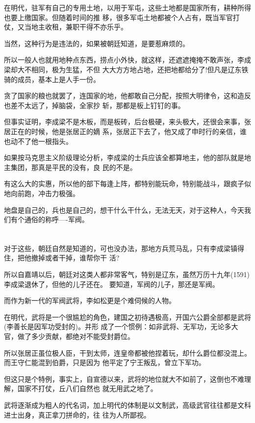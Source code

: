 \documentclass[11pt,a4paper,onecolumn]{article}
\begin{document}
在明代，驻军有自己的专用土地，以用于军屯，这些土地都是国家所有，耕种所得也要上缴国家。但随着时间的推
移，很多军屯土地都被个人占有，既当军官打仗，又当地主收租，兼职干得不亦乐乎。

当然，这种行为是违法的，如果被朝廷知道，是要惹麻烦的。

所以一般人也就用地种点东西，捞点小外快，就这样，还遮遮掩掩不敢声张，李成梁却大不相同，极为生猛，不但
大大方方地占地，还把地都给分了!但凡是辽东铁骑的成员，基本上是人手一份。

贪了国家的粮也就罢了，连国家的地，他都敢自己分配，按照大明律令，这和造反也差不太远了，掉脑袋，全家抄
斩，那都是板上钉钉的事。

但事实证明，李成梁不是木板，而是板砖，后台极硬，来头极大，还很会来事，张居正在的时候，他是张居正的嫡
系，张居正下去了，他又成了申时行的亲信，谁也动不了他一根指头。

如果按马克思主义阶级理论分析，李成梁的士兵应该全都算地主，他的部队就是地主集团，那真是平民的没有，良
民的不是。

有这么大的实惠，所以他的部下每逢上阵，都特别能玩命，特别能战斗，跟疯子似地向前跑，冲击力极强。

地盘是自己的，兵也是自己的，想干什么干什么，无法无天，对于这种人，今天我们有个通俗的称呼----军阀。

\section[\thesection]{}

对于这些，朝廷自然是知道的，可也没办法，那地方兵荒马乱，只有李成梁镇得住，把他撤掉或者干掉，谁帮你干
活?

所以自嘉靖以后，朝廷对这类人都非常客气，特别是辽东，虽然万历十九年(1591)李成梁退休了，但他的儿子还在。
要知道，军阀的儿子，那还是军阀。

而作为新一代的军阀武将，李如松更是个难伺候的人物。

在明代，武将是一个很尴尬的角色，建国之初待遇极高，开国六公爵全部都是武将(李善长是因军功受封的)。并形
成了一个惯例：如非武将、无军功，无论多大官，做了多少贡献，都绝对不能受封爵位。

所以张居正虽位极人臣，干到太师，连皇帝都被他捏着玩，却什么爵位都没混上。而王守仁能混到伯爵，只是因为
他平定了宁王叛乱，曾立下军功。

但这只是个特例，事实上，自宣德以来，武将的地位就大不如前了，这倒也不难理解，国家不打仗，丘八们自然也
就无用武之地了。

武将逐渐成为粗人的代名词，加上明代的体制是以文制武，高级武官往往都是文科进士出身，真正拿刀拼命的，往
往为人所鄙视。
\end{document}
